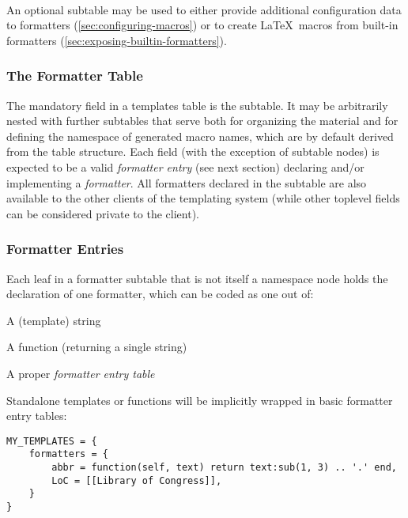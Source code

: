 \documentclass{scrartcl}
\begin{document}
\paragraph{}

An optional subtable  may be used to either provide
additional configuration data to formatters (\vref{sec:configuring-macros}) or
to create \LaTeX\ macros from built-in formatters
(\vref{sec:exposing-builtin-formatters}).


\subsubsection{The Formatter Table}
\label{sec:formatter-table}

The mandatory field in a templates table is the  subtable. It
may be arbitrarily nested with further subtables that serve both for organizing
the material and for defining the namespace of generated macro names, which are
by default derived from the table structure.  Each field (with the exception of
subtable nodes) is expected to be a valid \emph{formatter entry} (see next
section) declaring and/or implementing a \emph{formatter}.  All formatters
declared in the  subtable are also available to the other
clients of the templating system (while other toplevel fields can be considered
private to the client).


\subsubsection{Formatter Entries}
\label{sec:formatter-entries}

Each leaf in a formatter subtable that is not itself a namespace node holds the
declaration of one formatter, which can be coded as one out of:

\begin{itemize*}
\item A (template) string
\item A function (returning a single string)
\item A proper \emph{formatter entry table}
\end{itemize*}

Standalone templates or functions will be implicitly wrapped in basic formatter
entry tables:

\begin{verbatim}
MY_TEMPLATES = {
    formatters = {
        abbr = function(self, text) return text:sub(1, 3) .. '.' end,
        LoC = [[Library of Congress]],
    }
}
\end{verbatim}
\end{document}
